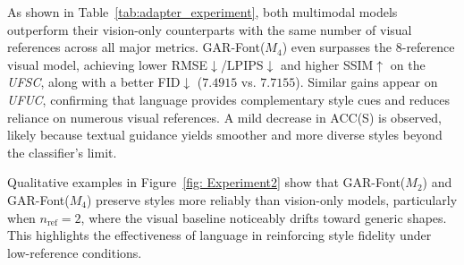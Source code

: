 As shown in Table~\ref{tab:adapter_experiment}, both multimodal models outperform their vision-only counterparts with the same number of visual references across all major metrics. GAR-Font($M_4$) even surpasses the 8-reference visual model, achieving lower RMSE$\downarrow$/LPIPS$\downarrow$ and higher SSIM$\uparrow$ on the \textit{UFSC}, along with a better FID$\downarrow$ ($7.4915$ vs. $7.7155$). Similar gains appear on \textit{UFUC}, confirming that language provides complementary style cues and reduces reliance on numerous visual references. A mild decrease in ACC(S) is observed, likely because textual guidance yields smoother and more diverse styles beyond the classifier’s limit.

Qualitative examples in Figure~\ref{fig: Experiment2} show that GAR-Font($M_2$) and GAR-Font($M_4$) preserve styles more reliably than vision-only models, particularly when $n_\text{ref}=2$, where the visual baseline noticeably drifts toward generic shapes. This highlights the effectiveness of language in reinforcing style fidelity under low-reference conditions.



